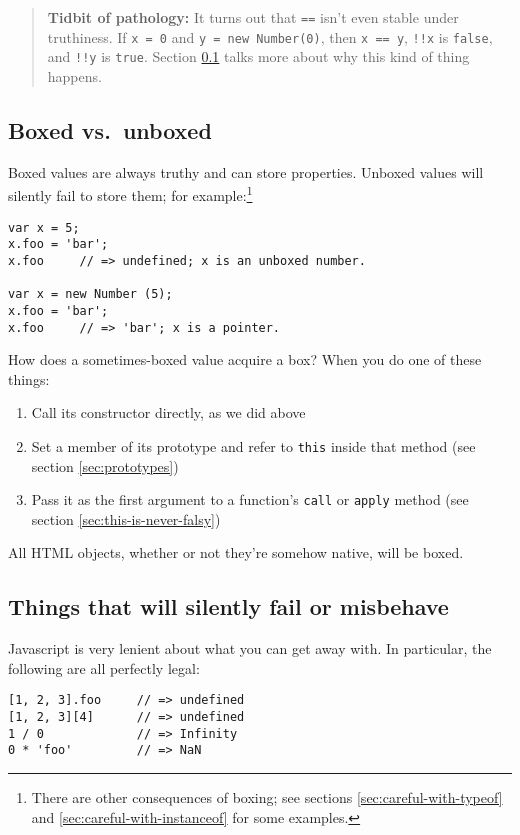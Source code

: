 \documentclass{article}
\begin{document}
    \begin{quote}
      {\bf Tidbit of pathology:} It turns out that {\tt ==} isn't even stable under truthiness. If {\tt x = 0} and {\tt y = new Number(0)}, then {\tt x == y}, {\tt !!x} is {\tt false}, and
      {\tt !!y} is {\tt true}. Section \ref{sec:boxing} talks more about why this kind of thing happens.
    \end{quote}

\subsection {Boxed vs.~unboxed}
    \label{sec:boxing}
    Boxed values are always truthy and can store properties. Unboxed values will silently fail to store them; for example:\footnote{There are other consequences of boxing; see sections
    \ref{sec:careful-with-typeof} and \ref{sec:careful-with-instanceof} for some examples.}

\begin{verbatim}
var x = 5;
x.foo = 'bar';
x.foo     // => undefined; x is an unboxed number.

var x = new Number (5);
x.foo = 'bar';
x.foo     // => 'bar'; x is a pointer.
\end{verbatim}

    How does a sometimes-boxed value acquire a box? When you do one of these things:

\begin{enumerate}
\item Call its constructor directly, as we did above
\item Set a member of its prototype and refer to \verb|this| inside that method (see section \ref{sec:prototypes})
\item Pass it as the first argument to a function's {\tt call} or {\tt apply} method (see section \ref{sec:this-is-never-falsy})
\end{enumerate}

    All HTML objects, whether or not they're somehow native, will be boxed.

\subsection {Things that will silently fail or misbehave}
    Javascript is very lenient about what you can get away with. In particular, the following are all perfectly legal:

\begin{verbatim}
[1, 2, 3].foo     // => undefined
[1, 2, 3][4]      // => undefined
1 / 0             // => Infinity
0 * 'foo'         // => NaN
\end{verbatim}
\end{document}
